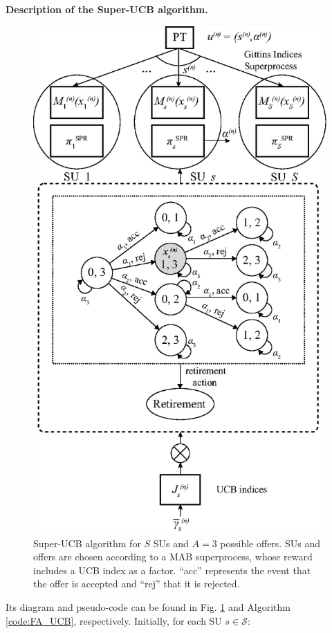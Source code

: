 \textbf{Description of the Super-UCB algorithm.}
\begin{figure}[!t]
\centering
\includegraphics[scale=0.8]{esquemaSuper.eps}
\caption{Super-UCB algorithm for $S$ SUs and $A=3$ possible offers. SUs and offers are chosen according to a MAB superprocess, whose reward includes a UCB index as a factor. ``acc'' represents the event that the offer is accepted and ``rej'' that it is rejected.}
\label{fig:esquemaSuper}
\end{figure}
Its diagram and pseudo-code can be found in Fig. \ref{fig:esquemaSuper} and Algorithm \ref{code:FA_UCB}, respectively. Initially, for each SU $s \in \mathcal{S}$:
